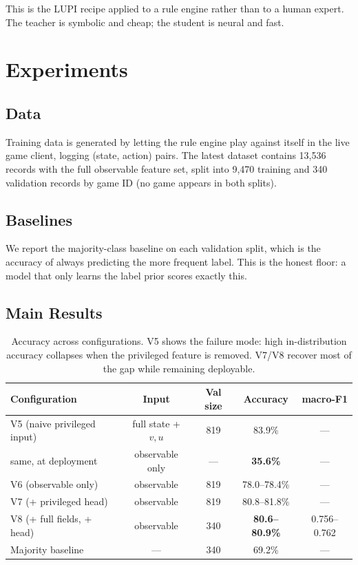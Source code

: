 \documentclass[11pt]{article}
\begin{document}
This is the LUPI recipe applied to a rule engine rather than to a human expert. The teacher is symbolic and cheap; the student is neural and fast.

\section{Experiments}
\label{sec:experiments}

\subsection{Data}

Training data is generated by letting the rule engine play against itself in the live game client, logging (state, action) pairs. The latest dataset contains 13,536 records with the full observable feature set, split into 9,470 training and 340 validation records by game ID (no game appears in both splits).

\subsection{Baselines}

We report the majority-class baseline on each validation split, which is the accuracy of always predicting the more frequent label. This is the honest floor: a model that only learns the label prior scores exactly this.

\subsection{Main Results}

\begin{table}[t]
\centering
\small
\begin{tabular}{@{}lcccc@{}}
\toprule
\textbf{Configuration} & \textbf{Input} & \textbf{Val size} & \textbf{Accuracy} & \textbf{macro-F1} \\
\midrule
V5 (naive privileged input) & full state + $v,u$ & 819 & 83.9\% & --- \\
\quad same, at deployment & observable only & --- & \textbf{35.6\%} & --- \\
\midrule
V6 (observable only) & observable & 819 & 78.0--78.4\% & --- \\
V7 (+ privileged head) & observable & 819 & 80.8--81.8\% & --- \\
V8 (+ full fields, + head) & observable & 340 & \textbf{80.6--80.9\%} & 0.756--0.762 \\
\midrule
Majority baseline & --- & 340 & 69.2\% & --- \\
\bottomrule
\end{tabular}
\caption{Accuracy across configurations. V5 shows the failure mode: high in-distribution accuracy collapses when the privileged feature is removed. V7/V8 recover most of the gap while remaining deployable.}
\label{tab:main}
\end{table}
\end{document}
